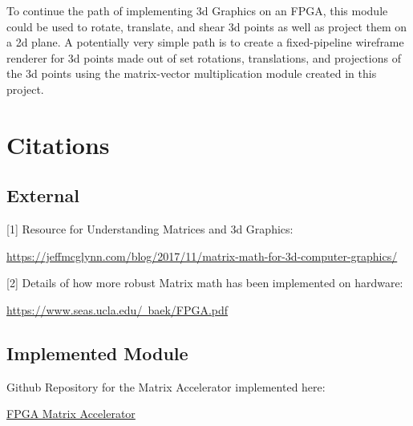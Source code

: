\documentclass{article}
\begin{document}
To continue the path of implementing 3d Graphics on an FPGA, this module could be used to rotate, translate, and shear 3d points as well as project them on a 2d plane. A potentially very simple path is to create a fixed-pipeline wireframe renderer for 3d points made out of set rotations, translations, and projections of the 3d points using the matrix-vector multiplication module created in this project.
\section{Citations}
\subsection{External}

[1] Resource for Understanding Matrices and 3d Graphics:

\href{https://jeffmcglynn.com/blog/2017/11/matrix-math-for-3d-computer-graphics/}{https://jeffmcglynn.com/blog/2017/11/matrix-math-for-3d-computer-graphics/}

\noindent{}[2] Details of how more robust Matrix math has been implemented on hardware:

\href{https://www.seas.ucla.edu/~baek/FPGA.pdf}{https://www.seas.ucla.edu/~baek/FPGA.pdf}

\subsection{Implemented Module}
Github Repository for the Matrix Accelerator implemented here:

\href{https://github.com/BenjiPugh/FPGA-Matrix-Accelerator}{FPGA Matrix Accelerator}
\end{document}
